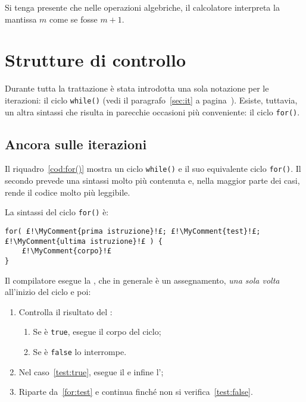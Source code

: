 Si tenga presente che nelle operazioni algebriche, il calcolatore interpreta la mantissa $m$ come se fosse $m+1$.

	\section{Strutture di controllo}
Durante  tutta la trattazione è stata introdotta una sola notazione per le iterazioni: il ciclo \lstinline!while()! (vedi il paragrafo~\ref{sec:it} a pagina~\pageref{sec:it}).
Esiste, tuttavia, un altra sintassi che risulta in parecchie occasioni più conveniente: il ciclo \lstinline!for()!.

		\subsection{Ancora sulle iterazioni}

Il riquadro~\ref{cod:for()} mostra un ciclo \lstinline!while()! e il suo equivalente ciclo \lstinline!for()!.
Il secondo prevede una sintassi molto più contenuta e, nella maggior parte dei casi, rende il codice molto più leggibile.



La sintassi del ciclo \lstinline!for()! è:
\begin{lstlisting}
for( £!\MyComment{prima istruzione}!£; £!\MyComment{test}!£; £!\MyComment{ultima istruzione}!£ ) {
	£!\MyComment{corpo}!£
}
\end{lstlisting}

Il compilatore esegue la , che in generale è un assegnamento, \emph{una sola volta} all'inizio del ciclo e poi:
\begin{enumerate}
	\item\label{for:test}
Controlla il risultato del :
	\begin{enumerate}
		\item\label{test:true}
Se è \lstinline!true!, esegue il corpo del ciclo;
		\item\label{test:false}
 Se è \lstinline!false! lo interrompe.
\end{enumerate}
	\item
Nel caso~\ref{test:true}, esegue il  e infine l';
	\item
Riparte da~\ref{for:test} e continua finché non si verifica~\ref{test:false}.
\end{enumerate}

